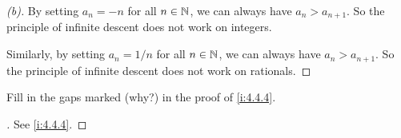 \begin{proof}[(b)]
  By setting \(a_n = -n\) for all \(n \in \mathbb{N}\), we can always have \(a_n > a_{n + 1}\).
  So the principle of infinite descent does not work on integers.

  Similarly, by setting \(a_n = 1 / n\) for all \(n \in \mathbb{N}\), we can always have \(a_n > a_{n + 1}\).
  So the principle of infinite descent does not work on rationals.
\end{proof}

\begin{ex}\label{i:ex:4.4.3}
  Fill in the gaps marked (why?) in the proof of \cref{i:4.4.4}.
\end{ex}

\begin{proof}[]
  See \cref{i:4.4.4}.
\end{proof}
